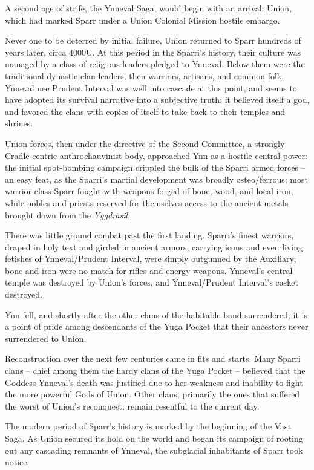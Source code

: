 A second age of strife, the Ynneval Saga, would begin with an arrival: Union, which had marked
Sparr under a Union Colonial Mission hostile embargo.

Never one to be deterred by initial failure, Union returned to Sparr hundreds of years later, circa
4000U. At this period in the Sparri's history, their culture was managed by a class of religious
leaders pledged to Ynneval. Below them were the traditional dynastic clan leaders, then warriors,
artisans, and common folk. Ynneval nee Prudent Interval was well into cascade at this point, and
seems to have adopted its survival narrative into a subjective truth: it believed itself a god, and
favored the clans with copies of itself to take back to their temples and shrines.

Union forces, then under the directive of the Second Committee, a strongly Cradle-centric
anthrochauvinist body, approached Ynn as a hostile central power: the initial spot-bombing
campaign crippled the bulk of the Sparri armed forces -- an easy feat, as the Sparri's martial
development was broadly osteo/ferrous; most warrior-class Sparr fought with weapons forged of
bone, wood, and local iron, while nobles and priests reserved for themselves access to the
ancient metals brought down from the \textit{Yggdrasil}.

There was little ground combat past the first landing. Sparri's finest warriors, draped in holy text
and girded in ancient armors, carrying icons and even living fetishes of Ynneval/Prudent Interval,
were simply outgunned by the Auxiliary; bone and iron were no match for rifles and energy
weapons. Ynneval's central temple was destroyed by Union's forces, and Ynneval/Prudent
Interval's casket destroyed.

Ynn fell, and shortly after the other clans of the habitable band surrendered; it is a point of pride
among descendants of the Yuga Pocket that their ancestors never surrendered to Union.

Reconstruction over the next few centuries came in fits and starts. Many Sparri clans -- chief
among them the hardy clans of the Yuga Pocket -- believed that the Goddess Ynneval's death
was justified due to her weakness and inability to fight the more powerful Gods of Union. Other
clans, primarily the ones that suffered the worst of Union's reconquest, remain resentful to the
current day.

The modern period of Sparr's history is marked by the beginning of the Vast Saga. As Union
secured its hold on the world and began its campaign of rooting out any cascading remnants of
Ynneval, the subglacial inhabitants of Sparr took notice.

